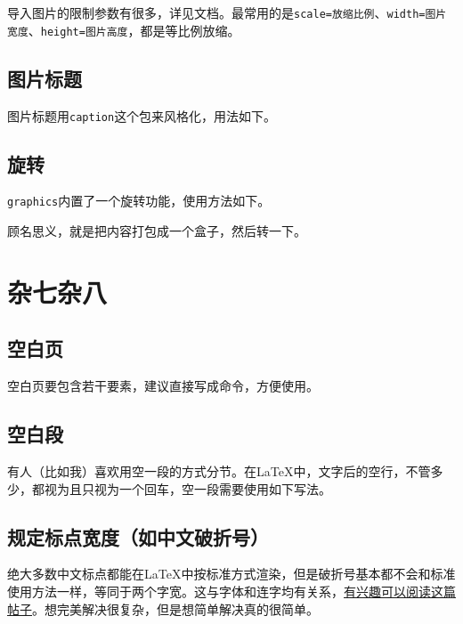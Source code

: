 \documentclass[10pt,openany]{book}
\begin{document}
导入图片的限制参数有很多，详见文档。最常用的是\texttt{scale=放缩比例}、\texttt{width=图片宽度}、\texttt{height=图片高度}，都是等比例放缩。

\section{图片标题}

图片标题用\texttt{caption}这个包来风格化，用法如下。



\section{旋转}

\texttt{graphics}内置了一个旋转功能，使用方法如下。



顾名思义，就是把内容打包成一个盒子，然后转一下。

\chapter{杂七杂八}

\section{空白页}

空白页要包含若干要素，建议直接写成命令，方便使用。



\section{空白段}
\label{blankpar}

有人（比如我）喜欢用空一段的方式分节。在\LaTeX 中，文字后的空行，不管多少，都视为且只视为一个回车，空一段需要使用如下写法。



\section{规定标点宽度（如中文破折号）}
\label{chsline}

绝大多数中文标点都能在\LaTeX 中按标准方式渲染，但是破折号基本都不会和标准使用方法一样，等同于两个字宽。这与字体和连字均有关系，\href{https://github.com/CTeX-org/ctex-kit/issues/382}{有兴趣可以阅读这篇帖子}。想完美解决很复杂，但是想简单解决真的很简单。
\end{document}
